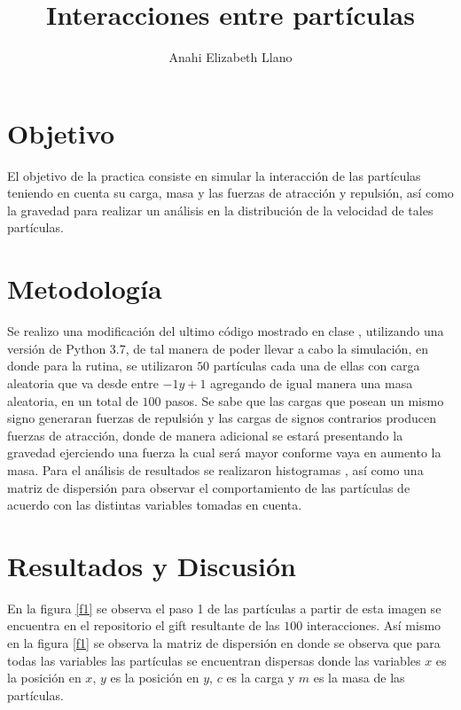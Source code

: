 \documentclass{article}
\begin{document}
\title{\textbf{Interacciones entre part\'iculas}}
\author{Anahi Elizabeth Llano}

\maketitle

\section{Objetivo}\label{obj}

El objetivo de la practica \cite{elisa} consiste en simular la interacci\'on de las part\'iculas teniendo en cuenta su carga, masa y las fuerzas de atracci\'on y repulsi\'on, as\'i como la gravedad para realizar un an\'alisis en la distribuci\'on de la velocidad de tales part\'iculas.


\section{Metodolog\'{i}a}\label{met}

Se realizo una modificaci\'on del ultimo c\'odigo mostrado en clase \cite{elisa}, utilizando una versi\'on de Python 3.7, de tal manera de poder llevar a cabo la simulaci\'on, en donde para la rutina, se utilizaron $50$ part\'iculas cada una de ellas con carga aleatoria que va desde entre $-1 y +1$ agregando de igual manera una masa aleatoria, en un total de $100$ pasos. Se sabe que las cargas que posean un mismo signo  generaran fuerzas de repulsi\'on y las cargas de signos contrarios producen fuerzas de atracci\'on, donde de manera adicional se estar\'a presentando la gravedad ejerciendo una fuerza la cual ser\'a mayor conforme vaya en aumento la masa.
Para el an\'alisis de resultados se realizaron histogramas \citep{daliadisc}, as\'i como una matriz de dispersi\'on \citep{elitedisc} para observar el comportamiento de las part\'iculas de acuerdo con las distintas variables tomadas en cuenta.

\section{Resultados y Discusi\'{o}n}\label{res}
 
En la figura \ref{f1} se observa el paso 1 de las part\'iculas a partir de esta imagen se encuentra en el repositorio  \citep{ana} el gift resultante de las $100$ interacciones. As\'i mismo en la figura  \ref{f1} se observa la matriz de dispersi\'on en donde se observa que para todas las variables las part\'iculas se encuentran dispersas donde las variables $x$ es la posici\'on en $x$, $y$ es la posici\'on en $y$, $c$ es la carga y $m$ es la masa de las part\'iculas.
\end{document}
